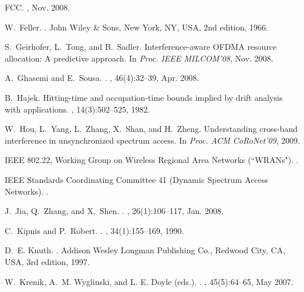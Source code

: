 \documentclass{amsart}
\begin{document}
\begin{thebibliography}{10}
{FCC}.
, Nov. 2008.

W.~Feller.
.
\newblock John Wiley \& Sons, New York, NY, USA, 2nd edition, 1966.

S.~Geirhofer, L.~Tong, and B.~Sadler.
\newblock Interference-aware \textsc{OFDMA} resource allocation: A predictive
  approach.
\newblock In {\em Proc. IEEE MILCOM'08}, Nov. 2008.

A.~Ghasemi and E.~Sousa.
.
, 46(4):32--39, Apr. 2008.

B.~Hajek.
\newblock Hitting-time and occupation-time bounds implied by drift analysis
  with applications.
, 14(3):502--525, 1982.

W.~Hou, L.~Yang, L.~Zhang, X.~Shan, and H.~Zheng.
\newblock Understanding cross-band interference in unsynchronized spectrum
  access.
\newblock In {\em Proc. ACM CoRoNet'09}, 2009.

{IEEE 802.22, Working Group on Wireless Regional Area Networks (``WRANs")}.
.

{IEEE Standards Coordinating Committee 41 (Dynamic Spectrum Access Networks)}.
.

J.~Jia, Q.~Zhang, and X.~Shen.
.
, 26(1):106--117, Jan. 2008.

C.~Kipnis and P.~Robert.
.
, 34(1):155--169,
  1990.

D.~E. Knuth.
.
\newblock Addison Wesley Longman Publishing Co., Redwood City, CA, USA, 3rd
  edition, 1997.

W.~Krenik, A.~M. Wyglinski, and {L. E. Doyle (eds.)}.
.
, 45(5):64--65, May 2007.


\end{thebibliography}
\end{document}
